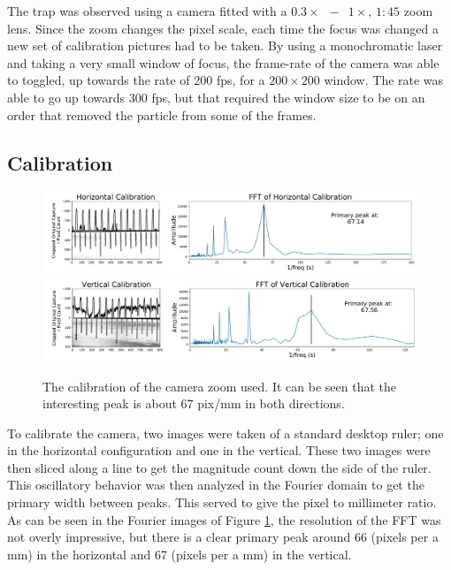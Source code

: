 \documentclass[12pt]{article}
\begin{document}
The trap was observed using a camera fitted with a $0.3\times$ $\,-\,$ $ 1\times$, $1:45$ zoom lens. Since the zoom changes the pixel scale, each time the focus was changed a new set of calibration pictures had to be taken. By using a monochromatic laser and taking a very small window of focus, the frame-rate of the camera was able to toggled, up towards the rate of 200 fps, for a $200 \times 200$ window. The rate was able to go up towards 300 fps, but that required the window size to be on an order that removed the particle from some of the frames. 


\subsection{Calibration}
\begin{figure}[ht]
\centering
    \includegraphics[width=\textwidth]{hori_cali.pdf}
    \includegraphics[width=\textwidth]{vert_cali.pdf}
	\caption{The calibration of the camera zoom used. It can be seen that the interesting peak is about 67 pix/mm in both directions.}
    \label{fig:calibration}
\end{figure}
To calibrate the camera, two images were taken of a standard desktop ruler; one in the horizontal configuration and one in the vertical. These two images were then sliced along a line to get the magnitude count down the side of the ruler. This oscillatory behavior was then analyzed in the Fourier domain to get the primary width between peaks. This served to give the pixel to millimeter ratio. As can be seen in the Fourier images of Figure \ref{fig:calibration}, the resolution of the FFT was not overly impressive, but there is a clear primary peak around 66 (pixels per a mm) in the horizontal and 67 (pixels per a mm) in the vertical.
\end{document}
